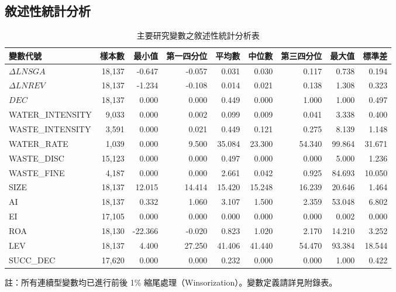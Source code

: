 \documentclass[12pt,a4paper]{article}
\begin{document}
\subsection{敘述性統計分析}

\begin{table}[H]
\centering
\caption{主要研究變數之敘述性統計分析表}
\label{tab:desc_stats}
\begin{threeparttable}
\small
\begin{tabular}{lrrrrrrrr}
\toprule
變數代號 & 樣本數 & 最小值 & 第一四分位 & 平均數 & 中位數 & 第三四分位 & 最大值 & 標準差 \\
\midrule
$\Delta LNSGA$ & 18,137 & -0.647 & -0.057 & 0.031 & 0.030 & 0.117 & 0.738 & 0.194 \\
$\Delta LNREV$ & 18,137 & -1.234 & -0.108 & 0.014 & 0.021 & 0.138 & 1.308 & 0.323 \\
$DEC$ & 18,137 & 0.000 & 0.000 & 0.449 & 0.000 & 1.000 & 1.000 & 0.497 \\
WATER\_INTENSITY & 9,033 & 0.000 & 0.002 & 0.099 & 0.009 & 0.041 & 3.338 & 0.400 \\
WASTE\_INTENSITY & 3,591 & 0.000 & 0.021 & 0.449 & 0.121 & 0.275 & 8.139 & 1.148 \\
WATER\_RATE & 1,039 & 0.000 & 9.500 & 35.084 & 23.300 & 54.340 & 99.864 & 31.671 \\
WASTE\_DISC & 15,123 & 0.000 & 0.000 & 0.497 & 0.000 & 0.000 & 5.000 & 1.236 \\
WASTE\_FINE & 4,187 & 0.000 & 0.000 & 2.661 & 0.042 & 0.925 & 84.693 & 10.050 \\
SIZE & 18,137 & 12.015 & 14.414 & 15.420 & 15.248 & 16.239 & 20.646 & 1.464 \\
AI & 18,137 & 0.332 & 1.060 & 3.107 & 1.500 & 2.359 & 53.048 & 6.802 \\
EI & 17,105 & 0.000 & 0.000 & 0.000 & 0.000 & 0.000 & 0.002 & 0.000 \\
ROA & 18,130 & -22.366 & -0.020 & 0.823 & 1.020 & 2.170 & 14.210 & 3.252 \\
LEV & 18,137 & 4.400 & 27.250 & 41.406 & 41.440 & 54.470 & 93.384 & 18.544 \\
SUCC\_DEC & 17,620 & 0.000 & 0.000 & 0.232 & 0.000 & 0.000 & 1.000 & 0.422 \\
\bottomrule
\end{tabular}
\begin{tablenotes}\footnotesize
\item 註：所有連續型變數均已進行前後 1\% 縮尾處理（Winsorization）。變數定義請詳見附錄表。
\end{tablenotes}
\end{threeparttable}
\end{table}
\end{document}
